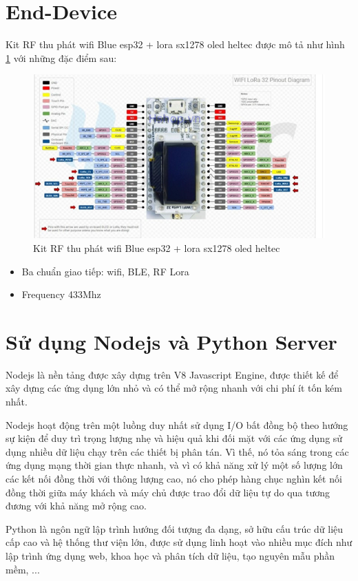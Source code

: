 \section{End-Device}
Kit RF thu phát wifi Blue esp32 + lora sx1278 oled heltec được mô tả như hình \ref{fig:lorawan_kit} với những đặc điểm sau:
\begin{figure}[H]
    \includegraphics[width=\textwidth]{images/Quanh/lora_kit.png}
    \caption{Kit RF thu phát wifi Blue esp32 + lora sx1278 oled heltec}
    \label{fig:lorawan_kit}
\end{figure}
\begin{itemize}
    \item Ba chuẩn giao tiếp: wifi, BLE, RF Lora
    \item Frequency 433Mhz
\end{itemize}

\section{Sử dụng Nodejs và Python Server}
Nodejs là nền tảng được xây dựng trên V8 Javascript Engine, được thiết kế để xây dựng các ứng dụng lớn nhỏ và có thể mở rộng nhanh với chi phí ít tốn kém nhất.

Nodejs hoạt động trên một luồng duy nhất sử dụng I/O bất đồng bộ theo hướng sự kiện để duy trì trọng lượng nhẹ và hiệu quả khi đối mặt với các ứng dụng sử dụng nhiều dữ liệu chạy trên các thiết bị phân tán. Vì thế, nó tỏa sáng trong các ứng dụng mạng thời gian thực nhanh, và vì có khả năng xử lý một số lượng lớn các kết nối đồng thời với thông lượng cao, nó cho phép hàng chục nghìn kết nối đồng thời giữa máy khách và máy chủ được trao đổi dữ liệu tự do qua tương đương với khả năng mở rộng cao.

Python là ngôn ngữ lập trình hướng đối tượng đa dạng, sở hữu cấu trúc dữ liệu cấp cao và hệ thống thư viện lớn, được sử dụng linh hoạt vào nhiều mục đích như lập trình ứng dụng web, khoa học và phân tích dữ liệu, tạo nguyên mẫu phần mềm, ...


